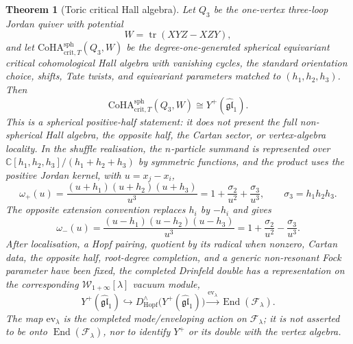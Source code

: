 \documentclass[11pt]{amsart}
\providecommand{\bC}{\mathbb{C}}
\providecommand{\cW}{\mathcal{W}}
\providecommand{\CoHA}{\mathrm{CoHA}}
\providecommand{\End}{\operatorname{End}}
\newtheorem{theorem}{Theorem}
\theoremstyle{definition}
\theoremstyle{remark}
\begin{document}
\begin{theorem}[Toric critical Hall algebra]
Let \(Q_3\) be the one-vertex three-loop Jordan quiver with potential
\[
        W=\operatorname{tr}(XYZ-XZY),
\]
and let \(\CoHA^{\mathrm{sph}}_{\mathrm{crit},T}(Q_3,W)\) be the
degree-one-generated spherical equivariant critical cohomological Hall
algebra with vanishing cycles, the standard orientation choice, shifts,
Tate twists, and equivariant parameters matched to \((h_1,h_2,h_3)\).
Then
\[
        \CoHA^{\mathrm{sph}}_{\mathrm{crit},T}(Q_3,W)
        \cong Y^+(\widehat{\mathfrak{gl}}_1).
\]
This is a spherical positive-half statement: it does not present the
full non-spherical Hall algebra, the opposite half, the Cartan sector, or
vertex-algebra locality.
In the shuffle realisation, the \(n\)-particle summand is represented over
\(\bC[h_1,h_2,h_3]/(h_1+h_2+h_3)\) by symmetric functions, and the product
uses the positive Jordan kernel, with \(u=x_j-x_i\),
\[
        \omega_+(u)=
        \frac{(u+h_1)(u+h_2)(u+h_3)}{u^3}
        =
        1+\frac{\sigma_2}{u^2}+\frac{\sigma_3}{u^3},
        \qquad \sigma_3=h_1h_2h_3 .
\]
The opposite extension convention replaces \(h_i\) by \(-h_i\) and gives
\[
        \omega_-(u)=
        \frac{(u-h_1)(u-h_2)(u-h_3)}{u^3}
        =
        1+\frac{\sigma_2}{u^2}-\frac{\sigma_3}{u^3}.
\]
After localisation, a Hopf pairing, quotient by its radical when nonzero,
Cartan data, the opposite half, root-degree completion, and a generic
non-resonant Fock parameter have been fixed, the completed Drinfeld
double has a representation on the corresponding
\(\cW_{1+\infty}[\lambda]\) vacuum module,
\[
        Y^+(\widehat{\mathfrak{gl}}_1)
        \hookrightarrow
        D^\wedge_{\mathrm{Hopf}}\bigl(Y^+(\widehat{\mathfrak{gl}}_1)\bigr)
        \xrightarrow{\mathrm{ev}_\lambda}
        \End(\mathcal{F}_\lambda).
\]
The map \(\mathrm{ev}_\lambda\) is the completed mode/enveloping action on
\(\mathcal{F}_\lambda\); it is not asserted to be onto
\(\End(\mathcal{F}_\lambda)\), nor to identify \(Y^+\) or its double with
the vertex algebra.
\end{theorem}
\end{document}
